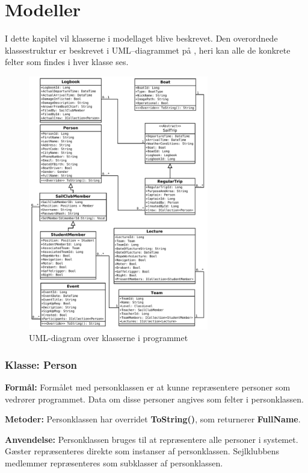 \chapter{Modeller} \label{chap:klasser}

I dette kapitel vil klasserne i modellaget blive beskrevet.
Den overordnede klassestruktur er beskrevet i UML--diagrammet på , heri kan alle de konkrete felter som findes i hver klasse ses.

\begin{figure}[H]
  \centering
  \includegraphics[width=0.70\textwidth]{images/flowcharts/UML.pdf}
  \caption{UML-diagram over klasserne i programmet}
  \label{img:UML}
\end{figure}

\subsection*{Klasse: Person}
\textbf{Formål:}
Formålet med personklassen er at kunne repræsentere personer som vedrører programmet.
Data om disse personer angives som felter i personklassen.

\textbf{Metoder:}
Personklassen har overridet \textbf{ToString()}, som returnerer \textbf{FullName}.

\textbf{Anvendelse:}
Personklassen bruges til at repræsentere alle personer i systemet. 
Gæster repræsenteres direkte som instanser af personklassen. 
Sejlklubbens medlemmer repræsenteres som subklasser af personklassen. 

